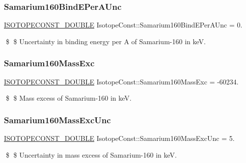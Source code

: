 \subsubsection{\texorpdfstring{Samarium160\+Bind\+E\+Per\+A\+Unc}{Samarium160BindEPerAUnc}}
{\footnotesize\ttfamily \mbox{\hyperlink{group___isotope_const-_macros_ga8f45a7272ce02c0b4c65c44636ed719a}{I\+S\+O\+T\+O\+P\+E\+C\+O\+N\+S\+T\+\_\+\+D\+O\+U\+B\+LE}} Isotope\+Const\+::\+Samarium160\+Bind\+E\+Per\+A\+Unc = 0.}

\$ \$ Uncertainty in binding energy per A of Samarium-\/160 in keV. \mbox{\label{group___isotope_const-_samarium-_sm160_gaa7de849a4de275bea701cf8bae7808f9}} 
\subsubsection{\texorpdfstring{Samarium160\+Mass\+Exc}{Samarium160MassExc}}
{\footnotesize\ttfamily \mbox{\hyperlink{group___isotope_const-_macros_ga8f45a7272ce02c0b4c65c44636ed719a}{I\+S\+O\+T\+O\+P\+E\+C\+O\+N\+S\+T\+\_\+\+D\+O\+U\+B\+LE}} Isotope\+Const\+::\+Samarium160\+Mass\+Exc = -\/60234.}

\$ \$ Mass excess of Samarium-\/160 in keV. \mbox{\label{group___isotope_const-_samarium-_sm160_ga2c669b1435e91afeb83430912220b146}} 
\subsubsection{\texorpdfstring{Samarium160\+Mass\+Exc\+Unc}{Samarium160MassExcUnc}}
{\footnotesize\ttfamily \mbox{\hyperlink{group___isotope_const-_macros_ga8f45a7272ce02c0b4c65c44636ed719a}{I\+S\+O\+T\+O\+P\+E\+C\+O\+N\+S\+T\+\_\+\+D\+O\+U\+B\+LE}} Isotope\+Const\+::\+Samarium160\+Mass\+Exc\+Unc = 5.}

\$ \$ Uncertainty in mass excess of Samarium-\/160 in keV. \mbox{\label{group___isotope_const-_samarium-_sm160_gaefd775f302f0375d7a118f1a47901a76}} 
